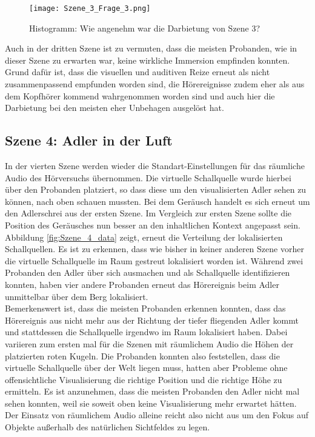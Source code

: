    \begin{figure}[H]
\centering
\texttt{[image: Szene\_3\_Frage\_3.png]}
\caption{Histogramm: Wie angenehm war die Darbietung von Szene 3?}
\label{fig:Szene_3_Frage3}
\end{figure} 

Auch in der dritten Szene ist zu vermuten, dass die meisten Probanden, wie in dieser Szene zu erwarten war,  keine wirkliche Immersion empfinden konnten. Grund dafür ist, dass die visuellen und auditiven Reize erneut als nicht zusammenpassend empfunden worden sind, die Hörereignisse zudem eher als aus dem Kopfhörer kommend wahrgenommen worden sind und auch hier die Darbietung bei den meisten eher Unbehagen ausgelöst hat. 

 \subsection{Szene 4: Adler in der Luft}
In der vierten Szene werden wieder die Standart-Einstellungen für das räumliche Audio des Hörversuchs übernommen. Die virtuelle Schallquelle wurde hierbei über den Probanden platziert, so dass diese um den visualisierten Adler sehen zu können, nach oben schauen mussten. Bei dem Geräusch handelt es sich erneut um den Adlerschrei aus der ersten Szene. Im Vergleich zur ersten Szene sollte die Position des Geräusches nun besser an den inhaltlichen Kontext angepasst sein. \\

Abbildung \ref{fig:Szene_4_data} zeigt, erneut die Verteilung der lokalisierten Schallquellen. Es ist zu erkennen, dass wie bisher in keiner anderen Szene vorher die virtuelle Schallquelle im Raum gestreut lokalisiert worden ist. Während zwei Probanden den Adler über sich ausmachen und als Schallquelle identifizieren konnten, haben vier andere Probanden erneut das Hörereignis beim Adler unmittelbar über dem Berg lokalisiert. \\

Bemerkenswert ist, dass die meisten Probanden erkennen konnten, dass das Hörereignis aus nicht mehr aus der Richtung der tiefer fliegenden Adler kommt und stattdessen die Schallquelle irgendwo im Raum lokalisiert haben. Dabei variieren zum ersten mal für die Szenen mit räumlichem Audio die Höhen der platzierten roten Kugeln. Die Probanden konnten also feststellen, dass die virtuelle Schallquelle über der Welt liegen muss, hatten aber Probleme ohne offensichtliche Visualisierung die richtige Position und die richtige Höhe zu ermitteln. Es ist anzunehmen, dass die meisten Probanden den Adler nicht mal sehen konnten, weil sie soweit oben keine Visualisierung mehr erwartet hätten. Der Einsatz von räumlichem Audio alleine reicht also nicht aus um den Fokus auf Objekte außerhalb des natürlichen Sichtfeldes zu legen. 

